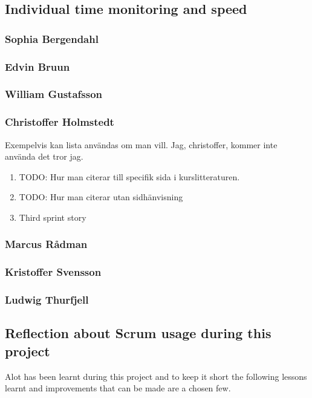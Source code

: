 \subsection{Individual time monitoring and speed}
\subsubsection{Sophia Bergendahl}
\subsubsection{Edvin Bruun}
\subsubsection{William Gustafsson}
\subsubsection{Christoffer Holmstedt}
Exempelvis kan lista användas om man vill. Jag, christoffer, kommer inte använda det tror jag.
\begin{enumerate}
\item TODO: Hur man citerar till specifik sida i kurslitteraturen. \cite[p.~42]{kniberg07}
\item TODO: Hur man citerar utan sidhänvisning \cite{kniberg07}
\item Third sprint story
\end{enumerate}
\subsubsection{Marcus Rådman}
\subsubsection{Kristoffer Svensson}
\subsubsection{Ludwig Thurfjell}
\subsection{Reflection about Scrum usage during this project}
Alot has been learnt during this project and to keep it short the following lessons learnt and improvements that can be made are a chosen few.

